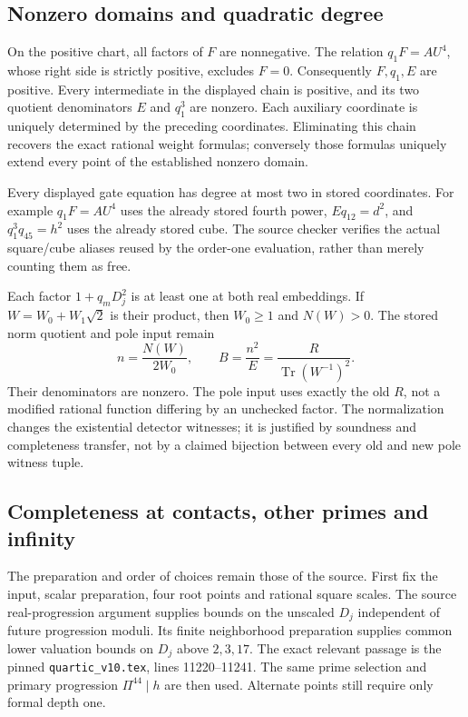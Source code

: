 \subsection{Nonzero domains and quadratic degree}

On the positive chart, all factors of $F$ are nonnegative. The relation
$q_1F=AU^4$, whose right side is strictly positive, excludes $F=0$.
Consequently $F,q_1,E$ are positive. Every intermediate in the displayed
chain is positive, and its two quotient denominators $E$ and $q_1^3$
are nonzero. Each auxiliary coordinate is uniquely determined by the
preceding coordinates. Eliminating this chain recovers the exact rational
weight formulas; conversely those formulas uniquely extend every point
of the established nonzero domain.

Every displayed gate equation has degree at most two in stored
coordinates. For example $q_1F=AU^4$ uses the already stored fourth
power, $Eq_{12}=d^2$, and $q_1^3q_{45}=h^2$ uses the already stored cube.
The source checker verifies the actual square/cube aliases reused by the
order-one evaluation, rather than merely counting them as free.

Each factor $1+q_mD_j^2$ is at least one at both real embeddings. If
$W=W_0+W_1\sqrt2$ is their product, then $W_0\ge1$ and $N(W)>0$.
The stored norm quotient and pole input remain
\[
 n=\frac{N(W)}{2W_0},\qquad B=\frac{n^2}{E}
   =\frac{R}{\operatorname{Tr}(W^{-1})^2}.
\]
Their denominators are nonzero. The pole input uses exactly the old
$R$, not a modified rational function differing by an unchecked factor.
The normalization changes the existential detector witnesses; it is
justified by soundness and completeness transfer, not by a claimed
bijection between every old and new pole witness tuple.

\subsection{Completeness at contacts, other primes and infinity}

The preparation and order of choices remain those of the source.
First fix the input, scalar preparation, four root points and rational
square scales. The source real-progression argument supplies bounds on
the unscaled $D_j$ independent of future progression moduli. Its finite
neighborhood preparation supplies common lower valuation bounds on
$D_j$ above $2,3,17$. The exact relevant passage is the pinned
\texttt{quartic\_v10.tex}, lines 11220--11241. The same prime selection
and primary progression $\Pi^{44}\mid h$ are then used. Alternate
points still require only formal depth one.

